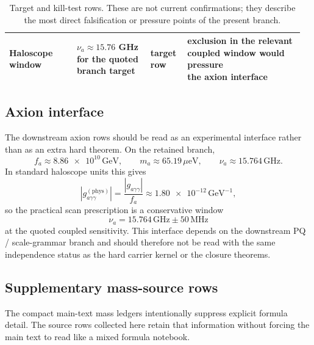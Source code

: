 \begin{table}[H]
{\begin{tabular}{@{}>{\raggedright\arraybackslash}p{0.22\linewidth}>{\raggedright\arraybackslash}p{0.24\linewidth}>{\raggedright\arraybackslash}p{0.12\linewidth}>{\raggedright\arraybackslash}p{0.38\linewidth}@{}}
Haloscope window & \makecell[l]{$\nu_a\approx\num{15.76}$ GHz\\for the quoted branch target} & \makecell[l]{target\\row} & \makecell[l]{exclusion in the relevant\\coupled window would pressure\\the axion interface} \\
\bottomrule
\end{tabular}}
\caption{Target and kill-test rows. These are not current confirmations; they describe the most direct falsification or pressure points of the present branch.}
\label{tab:kill-tests}
\end{table}

\subsection{Axion interface}

The downstream axion rows should be read as an experimental interface rather than as an extra hard theorem. On the retained branch,
\[
f_a\approx \num{8.86e10}\,\mathrm{GeV},
\qquad
m_a\approx \num{65.19}\,\mu\mathrm{eV},
\qquad
\nu_a\approx \num{15.764}\,\mathrm{GHz}.
\]
In standard haloscope units this gives
\[
\left|g_{a\gamma\gamma}^{(\mathrm{phys})}\right|
=
\frac{|g_{a\gamma\gamma}|}{f_a}
\approx
\num{1.80e-12}\,\mathrm{GeV}^{-1},
\]
so the practical scan prescription is a conservative window
\[
\nu_a=\num{15.764}\,\mathrm{GHz}\pm \num{50}\,\mathrm{MHz}
\]
at the quoted coupled sensitivity. This interface depends on the downstream PQ / scale-grammar branch and should therefore not be read with the same independence status as the hard carrier kernel or the closure theorems.

\subsection{Supplementary mass-source rows}

The compact main-text mass ledgers intentionally suppress explicit formula detail. The source rows collected here retain that information without forcing the main text to read like a mixed formula notebook.

